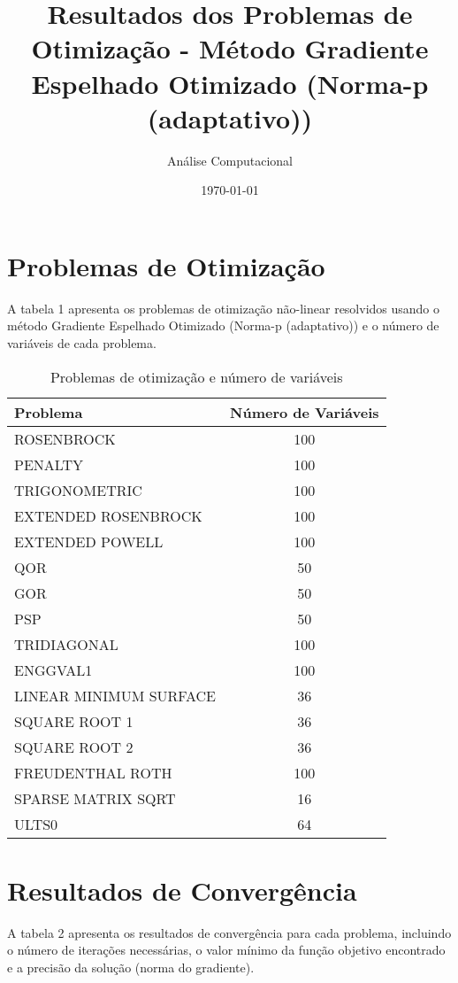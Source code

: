 \documentclass[12pt]{article}
\title{Resultados dos Problemas de Otimização - Método Gradiente Espelhado Otimizado (Norma-p (adaptativo))}
\author{Análise Computacional}
\date{\today}
\begin{document}
\maketitle

\section{Problemas de Otimização}

A tabela 1 apresenta os problemas de otimização não-linear resolvidos usando o método Gradiente Espelhado Otimizado (Norma-p (adaptativo)) e o número de variáveis de cada problema.

\begin{table}[h!]
\centering
\caption{Problemas de otimização e número de variáveis}
\label{tab:problemas_variáveis}
\begin{tabular}{@{}|lc|@{}}
\toprule
\textbf{Problema} & \textbf{Número de Variáveis} \\
\midrule
ROSENBROCK & 100 \\
PENALTY & 100 \\
TRIGONOMETRIC & 100 \\
EXTENDED ROSENBROCK & 100 \\
EXTENDED POWELL & 100 \\
QOR & 50 \\
GOR & 50 \\
PSP & 50 \\
TRIDIAGONAL & 100 \\
ENGGVAL1 & 100 \\
LINEAR MINIMUM SURFACE & 36 \\
SQUARE ROOT 1 & 36 \\
SQUARE ROOT 2 & 36 \\
FREUDENTHAL ROTH & 100 \\
SPARSE MATRIX SQRT & 16 \\
ULTS0 & 64 \\
\bottomrule
\end{tabular}
\end{table}

\section{Resultados de Convergência}

A tabela 2 apresenta os resultados de convergência para cada problema, incluindo o número de iterações necessárias, o valor mínimo da função objetivo encontrado e a precisão da solução (norma do gradiente).
\end{document}

